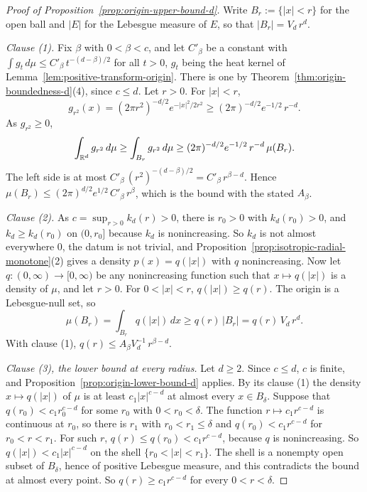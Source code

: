 \begin{proof}[Proof of Proposition~\ref{prop:origin-upper-bound-d}]
Write $B_r := \{|x| < r\}$ for the open ball and $|E|$ for the Lebesgue measure of $E$, so that
$|B_r| = V_d\,r^d$.

\emph{Clause (1).} Fix $\beta$ with $0 < \beta < c$, and let $C'_\beta$ be a constant with
$\int g_t\,d\mu \le C'_\beta\,t^{-(d-\beta)/2}$ for all $t > 0$, $g_t$ being the heat kernel of
Lemma~\ref{lem:positive-transform-origin}. There is one by Theorem~\ref{thm:origin-boundedness-d}(4), since
$c \le d$. Let $r > 0$. For $|x| < r$,
\[
  g_{r^2}(x) = (2\pi r^2)^{-d/2}e^{-|x|^2/2r^2} \ge (2\pi)^{-d/2}e^{-1/2}\,r^{-d} .
\]
As $g_{r^2} \ge 0$,
\[
  \int_{\mathbb{R}^d} g_{r^2}\,d\mu \ge \int_{B_r} g_{r^2}\,d\mu
   \ge (2\pi)^{-d/2}e^{-1/2}\,r^{-d}\,\mu(B_r) .
\]
The left side is at most $C'_\beta\,(r^2)^{-(d-\beta)/2} = C'_\beta\,r^{\beta-d}$. Hence
$\mu(B_r) \le (2\pi)^{d/2}e^{1/2}\,C'_\beta\,r^{\beta}$, which is the bound with the stated
$A_\beta$.

\emph{Clause (2).} As $c = \sup_{r>0}k_d(r) > 0$, there is $r_0 > 0$ with $k_d(r_0) > 0$, and
$k_d \ge k_d(r_0)$ on $(0,r_0]$ because $k_d$ is nonincreasing. So $k_d$ is not almost everywhere
$0$, the datum is not trivial, and Proposition~\ref{prop:isotropic-radial-monotone}(2) gives a density
$p(x) = q(|x|)$ with $q$ nonincreasing. Now let $q : (0,\infty) \to [0,\infty)$ be any
nonincreasing function such that $x \mapsto q(|x|)$ is a density of $\mu$, and let $r > 0$. For
$0 < |x| < r$, $q(|x|) \ge q(r)$. The origin is a Lebesgue-null set, so
\[
  \mu(B_r) = \int_{B_r} q(|x|)\,dx \ge q(r)\,|B_r| = q(r)\,V_d\,r^d .
\]
With clause (1), $q(r) \le A_\beta V_d^{-1}\,r^{\beta-d}$.

\emph{Clause (3), the lower bound at every radius.} Let $d \ge 2$. Since $c \le d$, $c$ is finite,
and Proposition~\ref{prop:origin-lower-bound-d} applies. By its clause (1) the density $x \mapsto q(|x|)$ of
$\mu$ is at least $c_1|x|^{c-d}$ at almost every $x \in B_\delta$. Suppose that
$q(r_0) < c_1 r_0^{c-d}$ for some $r_0$ with $0 < r_0 < \delta$. The function
$r \mapsto c_1 r^{c-d}$ is continuous at $r_0$, so there is $r_1$ with $r_0 < r_1 \le \delta$ and
$q(r_0) < c_1 r^{c-d}$ for $r_0 < r < r_1$. For such $r$, $q(r) \le q(r_0) < c_1 r^{c-d}$,
because $q$ is nonincreasing. So $q(|x|) < c_1|x|^{c-d}$ on the shell $\{r_0 < |x| < r_1\}$. The
shell is a nonempty open subset of $B_\delta$, hence of positive Lebesgue measure, and this
contradicts the bound at almost every point. So $q(r) \ge c_1 r^{c-d}$ for every $0 < r < \delta$.


\end{proof}
